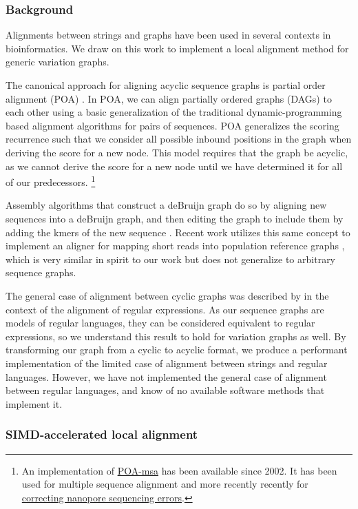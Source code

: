 \documentclass{article}
\begin{document}
\subsubsection{Background}

Alignments between strings and graphs have been used in several contexts in bioinformatics.
We draw on this work to implement a local alignment method for generic variation graphs.

The canonical approach for aligning acyclic sequence graphs is partial order alignment (POA) \cite{lee2002POA}.
In POA, we can align partially ordered graphs (DAGs) to each other using a basic generalization of the traditional dynamic-programming based alignment algorithms for pairs of sequences.
POA generalizes the scoring recurrence such that we consider all possible inbound positions in the graph when deriving the score for a new node.
This model requires that the graph be acyclic, as we cannot derive the score for a new node until we have determined it for all of our predecessors.
\footnote{An implementation of \href{https://sourceforge.net/projects/poamsa/}{POA-msa} has been available since 2002. It has been used for multiple sequence alignment and more recently recently for \href{https://simpsonlab.github.io/2015/03/30/optimizing-hmm/}{correcting nanopore sequencing errors}.}

Assembly algorithms that construct a deBruijn graph do so by aligning new sequences into a deBruijn graph, and then editing the graph to include them by adding the kmers of the new sequence \cite{iqbal2013, zerbino2008}.
Recent work utilizes this same concept to implement an aligner for mapping short reads into population reference graphs \cite{prg2015}, which is very similar in spirit to our work but does not generalize to arbitrary sequence graphs.

The general case of alignment between cyclic graphs was described by \cite{myers1989} in the context of the alignment of regular expressions.
As our sequence graphs are models of regular languages, they can be considered equivalent to regular expressions, so we understand this result to hold for variation graphs as well.
By transforming our graph from a cyclic to acyclic format, we produce a performant implementation of the limited case of alignment between strings and regular languages. However, we have not implemented the general case of alignment between regular languages, and know of no available software methods that implement it.

\subsubsection{SIMD-accelerated local alignment}
\end{document}
